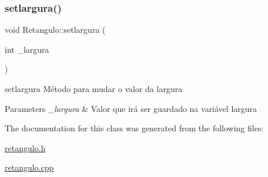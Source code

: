 \subsubsection{\texorpdfstring{setlargura()}{setlargura()}}
{\footnotesize\ttfamily void Retangulo\+::setlargura (\begin{DoxyParamCaption}\item[{int}]{\+\_\+largura }\end{DoxyParamCaption})}



setlargura Método para mudar o valor da largura 


\begin{DoxyParams}{Parameters}
{\em \+\_\+largura} & Valor que irá ser guardado na variável largura \\
\hline
\end{DoxyParams}


The documentation for this class was generated from the following files\+:\begin{DoxyCompactItemize}
\item 
\mbox{\hyperlink{retangulo_8h}{retangulo.\+h}}\item 
\mbox{\hyperlink{retangulo_8cpp}{retangulo.\+cpp}}\end{DoxyCompactItemize}
